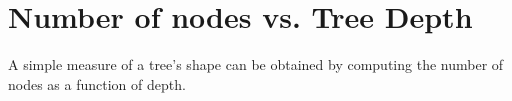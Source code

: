 \section{Number of nodes vs. Tree Depth}
\label{clades_vs_depth}

A simple measure of a tree's shape can be obtained by computing the number of
nodes as a function of depth.
